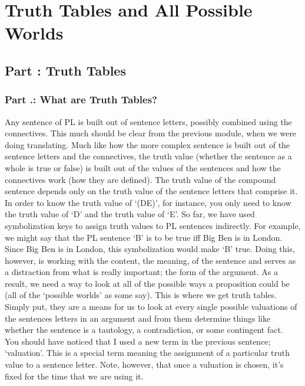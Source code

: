 \part{Truth Tables and All Possible Worlds}
\label{ch.TruthTables}
\setcounter{seccount}{1}
\chapter{Part \thechapcount: Truth Tables}
\section{Part \thechapcount.\theseccount: What are Truth Tables?}
Any sentence of PL is built out of sentence letters, possibly combined using the connectives. This much should be clear from the previous module, when we were doing translating. Much like how the more complex sentence is built out of the sentence letters and the connectives, the \gls{truth value} (whether the sentence as a whole is true or false) is built out of the values of the sentences and how the connectives work (how they are defined). The truth value of the compound sentence depends only on the truth value of the sentence letters that comprise it. In order to know the truth value of ‘(D\eand E)’, for instance, you only need to know the truth value of ‘D’ and the truth value of ‘E’. So far, we have used symbolization keys to assign truth values to PL sentences indirectly. For example, we might say that the PL sentence ‘B’ is to be true iff Big Ben is in London. Since Big Ben is in London, this symbolization would make ‘B’ true. Doing this, however, is working with the content, the meaning, of the sentence and serves as a distraction from what is really important; the form of the argument. As a result, we need a way to look at all of the possible ways a proposition could be (all of the `possible worlds' as some say). This is where we get truth tables. Simply put, they are a means for us to look at every single possible valuations of the sentences letters in an argument and from them determine things like whether the sentence is a tautology, a contradiction, or some contingent fact.  You should have noticed that I used a new term in the previous sentence; `\gls{valuation}'. This is a special term meaning the assignment of a particular truth value to a sentence letter. Note, however, that once a valuation is chosen, it's fixed for the time that we are using it. 

